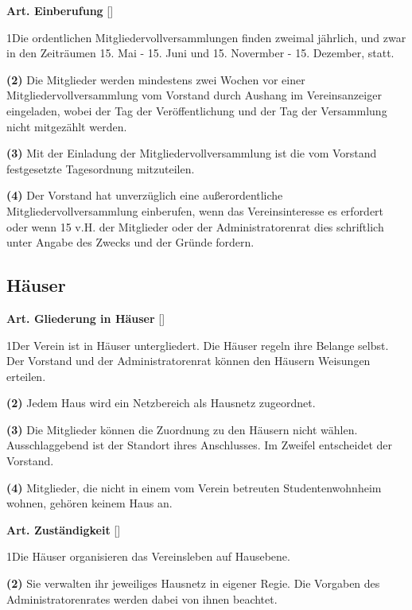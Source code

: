 \documentclass[12pt]{article}
\newcommand{\UAbschnitt}[1]{\subsection{#1}}
\newcommand{\Satz}[2]{

\begin{samepage}
{\bf (#1)} #2
\end{samepage}
}
\newenvironment{Artikel}[2]{
\bigskip \centerline{{\bf Art. #1} [#2]}
\nopagebreak
}{
}
\begin{document}
\begin{Artikel}{16}{Einberufung}

\Satz{1}{Die ordentlichen Mitgliedervollversammlungen finden zweimal jährlich,
und zwar in den Zeiträumen 15. Mai - 15. Juni und 15. Novermber - 15. Dezember, statt.}

\Satz{2}{Die Mitglieder werden mindestens zwei Wochen vor einer
Mitgliedervollversammlung vom Vorstand durch Aushang im Vereinsanzeiger
eingeladen, wobei der Tag der Ver\-öffent\-lichung und der Tag der Versammlung
nicht mitgezählt werden.}

\Satz{3}{Mit der Einladung der Mitgliedervollversammlung ist die vom Vorstand
festgesetzte Tagesordnung mitzuteilen.}

\Satz{4}{Der Vorstand hat unverzüglich  eine außerordentliche
Mitgliedervollversammlung einberufen, wenn das Vereinsinteresse es erfordert
oder wenn 15 v.H. der Mitglieder oder der Administratorenrat dies schriftlich
unter Angabe des Zwecks und der Gründe fordern.}

\end{Artikel}

\UAbschnitt{Häuser} 

\begin{Artikel}{17}{Gliederung in Häuser}

\Satz{1}{Der Verein ist in Häuser untergliedert. Die Häuser regeln ihre Belange
selbst. Der Vorstand und der Administratorenrat können den Häusern Weisungen
erteilen.}

\Satz{2}{Jedem Haus wird ein Netzbereich als Hausnetz zugeordnet.}

\Satz{3}{Die Mitglieder können die Zuordnung zu den Häusern nicht wählen. 
Ausschlaggebend ist der Standort ihres Anschlusses. Im Zweifel entscheidet der
Vorstand.}

\Satz{4}{Mitglieder, die nicht in einem vom Verein betreuten Studentenwohnheim
wohnen, gehören keinem Haus an.}

\end{Artikel}

\begin{Artikel}{18}{Zuständigkeit}

\Satz{1}{Die Häuser organisieren das Vereinsleben auf Hausebene.}

\Satz{2}{Sie verwalten ihr jeweiliges Hausnetz in eigener Regie. Die Vorgaben
des Administratorenrates werden dabei von ihnen beachtet.}

\end{Artikel}
\end{document}
